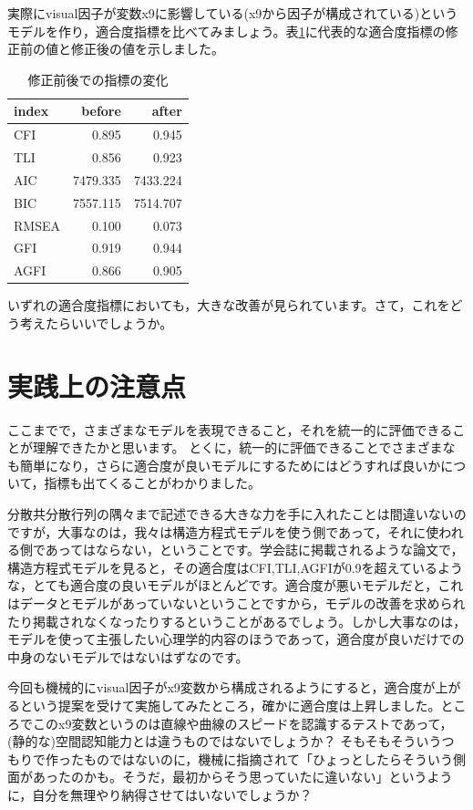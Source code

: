 \documentclass{ltjsbook}
\begin{document}
実際にvisual因子が変数x9に影響している(x9から因子が構成されている)というモデルを作り，適合度指標を比べてみましょう。表\ref{tab:13_03}に代表的な適合度指標の修正前の値と修正後の値を示しました。
\begin{table}[ht]
	\caption{修正前後での指標の変化}
	\centering
	\begin{tabular}[t]{l|rr}
		\hline
		index & before   & after    \\\hline
		CFI   & 0.895    & 0.945    \\
		TLI   & 0.856    & 0.923    \\
		AIC   & 7479.335 & 7433.224 \\
		BIC   & 7557.115 & 7514.707 \\
		RMSEA & 0.100    & 0.073    \\
		GFI   & 0.919    & 0.944    \\
		AGFI  & 0.866    & 0.905    \\
		\hline
	\end{tabular}
	\label{tab:13_03}
\end{table}
いずれの適合度指標においても，大きな改善が見られています。さて，これをどう考えたらいいでしょうか。

\section{実践上の注意点}
ここまでで，さまざまなモデルを表現できること，それを統一的に評価できることが理解できたかと思います。
とくに，統一的に評価できることでさまざまなも簡単になり，さらに適合度が良いモデルにするためにはどうすれば良いかについて，指標も出てくることがわかりました。

分散共分散行列の隅々まで記述できる大きな力を手に入れたことは間違いないのですが，大事なのは，我々は構造方程式モデルを使う側であって，それに使われる側であってはならない，ということです。学会誌に掲載されるような論文で，構造方程式モデルを見ると，その適合度はCFI,TLI,AGFIが0.9を超えているような，とても適合度の良いモデルがほとんどです。適合度が悪いモデルだと，これはデータとモデルがあっていないということですから，モデルの改善を求められたり掲載されなくなったりするということがあるでしょう。しかし大事なのは，モデルを使って主張したい心理学的内容のほうであって，適合度が良いだけでの中身のないモデルではないはずなのです。

今回も機械的にvisual因子がx9変数から構成されるようにすると，適合度が上がるという提案を受けて実施してみたところ，確かに適合度は上昇しました。ところでこのx9変数というのは直線や曲線のスピードを認識するテストであって，(静的な)空間認知能力とは違うものではないでしょうか？ そもそもそういうつもりで作ったものではないのに，機械に指摘されて「ひょっとしたらそういう側面があったのかも。そうだ，最初からそう思っていたに違いない」というように，自分を無理やり納得させてはいないでしょうか？
\end{document}
